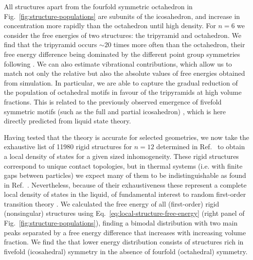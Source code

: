 \documentclass[11pt,twoside]{report}
\begin{document}
All structures apart from the fourfold symmetric octahedron in Fig.\ \ref{fig:structure-populations} are subunits of the icosahedron, and increase in concentration more rapidly than the octahedron until high density.
For $n=6$ we consider the free energies of two structures: the tripyramid and octahedron.
We find that the tripyramid occurs $\sim20$ times more often than the octahedron, their free energy difference being dominated by the different point group symmetries following \cite{MalinsJPCM2009,MengS2010}.
We can also estimate vibrational contributions, which allow us to match not only the relative but also the absolute values of free energies obtained from simulation.
In particular, we are able to capture the gradual reduction of the population of octahedral motifs in favour of the tripyramids at high volume fractions.
This is related to the previously observed emergence of fivefold symmetric motifs (such as the full and partial icosahedron) \cite{RoyallPR2015,TarjusJPCM2005,HallettNC2018,DunleavyNC2015}, which is here directly predicted from liquid state theory.

Having tested that the theory is accurate for selected geometries, we now take the exhaustive list of 11980 rigid structures for $n=12$ determined in Ref.\ \cite{Holmes-CerfonSR2016} to obtain a local density of states for a given sized inhomogeneity.
These rigid structures correspond to unique contact topologies, but in thermal systems (i.e. with finite gaps between particles) we expect many of them to be indistinguishable as found in Ref.\ \cite{TrombachPRE2018}.
Nevertheless, because of their exhaustiveness these represent a complete local density of states in the liquid, of fundamental interest to random first-order transition theory \cite{LubchenkoARPC2007}.
We calculated the free energy of all (first-order) rigid (nonsingular) structures using Eq.\ \eqref{eq:local-structure-free-energy} (right panel of Fig.\ \ref{fig:structure-populations}), finding a bimodal distribution with two main peaks separated by a free energy difference that increases with increasing volume fraction.
We find the that lower energy distribution consists of structures rich in fivefold (icosahedral) symmetry in the absence of fourfold (octahedral) symmetry.
\end{document}

